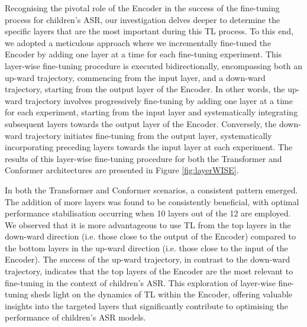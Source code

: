 Recognising the pivotal role of the Encoder in the success of the fine-tuning process for children's \ac{ASR}, our investigation delves deeper to determine the specific layers that are the most important during this \ac{TL} process. To this end, we adopted a meticulous approach where we incrementally fine-tuned the Encoder by adding one layer at a time for each fine-tuning experiment. This layer-wise fine-tuning procedure is executed bidirectionally, encompassing both an up-ward trajectory, commencing from the input layer, and a down-ward trajectory, starting from the output layer of the Encoder. In other words, the up-ward trajectory involves progressively fine-tuning by adding one layer at a time for each experiment, starting from the input layer and systematically integrating subsequent layers towards the output layer of the Encoder. Conversely, the down-ward trajectory initiates fine-tuning from the output layer, systematically incorporating preceding layers towards the input layer at each experiment. The results of this layer-wise fine-tuning procedure for both the Transformer and Conformer architectures are presented in Figure \ref{fig:layerWISE}.

In both the Transformer and Conformer scenarios, a consistent pattern emerged. The addition of more layers was found to be consistently beneficial, with optimal performance stabilisation occurring when 10 layers out of the 12 are employed. We observed that it is more advantageous to use \ac{TL} from the top layers in the down-ward direction (i.e. those close to the output of the Encoder) compared to the bottom layers in the up-ward direction (i.e. those close to the input of the Encoder). The success of the up-ward trajectory, in contrast to the down-ward trajectory, indicates that the top layers of the Encoder are the most relevant to fine-tuning in the context of children's \ac{ASR}. This exploration of layer-wise fine-tuning sheds light on the dynamics of \ac{TL} within the Encoder, offering valuable insights into the targeted layers that significantly contribute to optimising the performance of children's \ac{ASR} models. 


